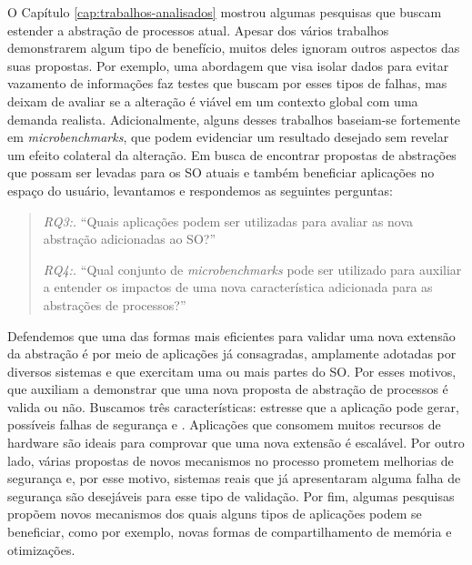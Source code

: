 O Capítulo \ref{cap:trabalhos-analisados} mostrou algumas pesquisas que buscam
estender a abstração de processos atual. Apesar dos vários trabalhos
demonstrarem algum tipo de benefício, muitos deles ignoram outros aspectos das
suas propostas. Por exemplo, uma abordagem que visa isolar dados para evitar
vazamento de informações faz testes que buscam por esses tipos de falhas, mas
deixam de avaliar se a alteração é viável em um contexto global com uma
demanda realista. Adicionalmente, alguns desses trabalhos baseiam-se
fortemente em \textit{microbenchmarks}, que podem evidenciar um resultado
desejado sem revelar um efeito colateral da alteração. Em busca de
encontrar propostas de abstrações que possam ser levadas para os SO atuais e
também beneficiar aplicações no espaço do usuário, levantamos e respondemos as
seguintes perguntas:

\begin{quote}
 \item \textit{RQ3:.} ``Quais aplicações podem ser utilizadas para avaliar as nova abstração adicionadas ao SO?''
 \item \textit{RQ4:.} ``Qual conjunto de \emph{microbenchmarks} pode ser utilizado para auxiliar a entender os impactos de uma nova característica adicionada para as abstrações de processos?''
\end{quote}

Defendemos que uma das formas mais eficientes para validar uma nova extensão da
abstração é por meio de aplicações já consagradas, amplamente adotadas por
diversos sistemas e que exercitam uma ou mais partes do SO. Por esses motivos,
 que auxiliam a demonstrar que uma nova proposta de
abstração de processos é valida ou não. Buscamos três características: estresse
que a aplicação pode gerar, possíveis falhas de segurança e .  Aplicações que consomem muitos recursos de hardware são ideais
para comprovar que uma nova extensão é escalável. Por outro lado, várias
propostas de novos mecanismos no processo prometem melhorias de segurança e, por
esse motivo, sistemas reais que já apresentaram alguma falha de segurança são
desejáveis para esse tipo de validação. Por fim, algumas pesquisas propõem
novos mecanismos dos quais alguns tipos de aplicações podem se beneficiar, como
por exemplo, novas formas de compartilhamento de memória e otimizações.

